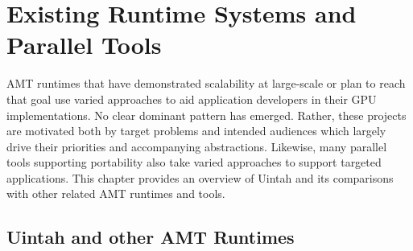 \documentclass[12pt]{article}
\begin{document}
\begin{abstract}
An overview of other runtimes and parallel tools is given in Chapter \ref{ch:related}.  Chapter \ref{ch:uintah_prior} describes the prior state of Uintah’s GPU engine.  Chapter \ref{ch:uintah_current} outlines work completed to date.  Chapter \ref{ch:workplan} provides remaining work required to meet the full goal of this thesis.  Chapter \ref{ch:thesis_format} outlines the proposed thesis format.  The remainder of this document contains the conclusion, references, and a list of my publications.   

\end{abstract}

\pagebreak
\tableofcontents
\pagebreak

\cleardoublepage
{}




\section{Existing Runtime Systems and Parallel Tools}
\label{ch:related}

AMT runtimes that have demonstrated scalability at large-scale or plan to reach that goal use varied approaches to aid application developers in their GPU implementations.   No clear dominant pattern has emerged.  Rather, these projects are motivated both by target problems and intended audiences which largely drive their priorities and accompanying abstractions.  Likewise, many parallel tools supporting portability also take varied approaches to support targeted applications.  This chapter provides an overview of Uintah and its comparisons with other related AMT runtimes and tools.  

\subsection{Uintah and other AMT Runtimes}
\label{ch:amt_runtimes}
\end{document}
